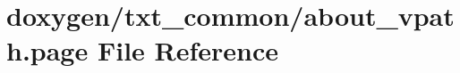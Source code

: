 \hypertarget{about__vpath_8page}{\section{doxygen/txt\-\_\-common/about\-\_\-vpath.page File Reference}
\label{about__vpath_8page}
}
